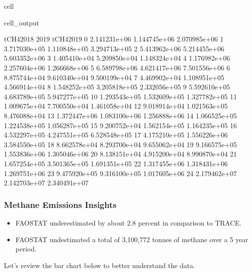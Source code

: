 \documentclass[letterpaper,10pt,english]{jupyterBook}
\begin{document}
\begin{sphinxuseclass}{cell}
\begin{sphinxVerbatimOutput}
\begin{sphinxuseclass}{cell_output}
\begin{sphinxVerbatim}[commandchars=\\\{\}]
       tCH4\PYGZus{}2018          2019     tCH4\PYGZus{}2019  
0   2.141231e+06  1.144745e+06  2.070985e+06  
1   3.717030e+05  1.110848e+05  3.294713e+05  
2   5.413962e+06  5.214455e+06  5.603352e+06  
3   1.405410e+04  5.209850e+04  1.148324e+04  
4   1.176982e+06  2.257604e+06  1.266668e+06  
5   6.589798e+06  4.621417e+06  7.501556e+06  
6   8.875744e+04  9.610340e+04  9.500199e+04  
7   4.469902e+04  1.108951e+05  4.566914e+04  
8   1.548252e+05  3.205818e+05  2.332056e+05  
9   5.592610e+05  4.683789e+05  5.947277e+05  
10  1.293543e+05  1.532609e+05  1.327782e+05  
11  1.009675e+04  7.700550e+04  1.461058e+04  
12  9.018914e+04  1.021563e+05  8.476088e+04  
13  1.372447e+06  1.083100e+06  1.256888e+06  
14  1.066525e+05  1.224538e+05  1.056287e+05  
15  9.200752e+04  1.562154e+05  1.164235e+05  
16  4.532297e+05  4.247551e+05  6.528548e+05  
17  4.175210e+05  1.556226e+06  3.584550e+05  
18  8.662578e+04  8.293700e+04  9.655062e+04  
19  9.166575e+05  1.553836e+06  1.305046e+06  
20  8.138151e+04  4.915200e+04  8.990870e+04  
21  1.657254e+05  3.501365e+05  1.691351e+05  
22  1.317455e+06  1.318431e+06  1.269751e+06  
23  9.475920e+05  9.316100e+05  1.017605e+06  
24  2.179462e+07  2.142703e+07  2.340491e+07  
\end{sphinxVerbatim}

\end{sphinxuseclass}\end{sphinxVerbatimOutput}

\end{sphinxuseclass}

\subsubsection{Methane Emissions Insights}
\label{\detokenize{notebooks/full_post:methane-emissions-insights}}\begin{itemize}
\item {} 
\sphinxAtStartPar
FAOSTAT underestimated by about 2.8 percent in comparison to TRACE.

\item {} 
\sphinxAtStartPar
FAOSTAT undestimated a total of 3,100,772 tonnes of methane over a 5 year period.

\end{itemize}

\sphinxAtStartPar
Let’s review the bar chart below to better understand the data.
\end{document}
